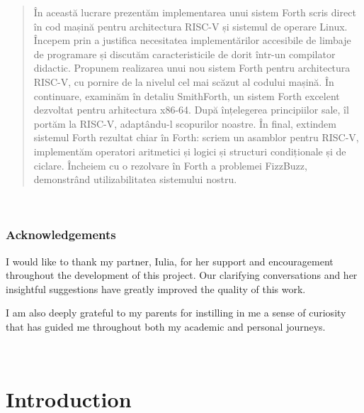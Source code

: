 \documentclass[a4paper,12pt,final]{article}
\begin{document}
\vspace{0.7cm}

\renewcommand{\abstractname}{Rezumat}
\begin{abstract}
În această lucrare prezentăm implementarea unui sistem Forth scris
direct în cod mașină pentru architectura RISC-V și sistemul de operare
Linux.  Începem prin a justifica necesitatea implementărilor
accesibile de limbaje de programare și discutăm caracteristicile de
dorit într-un compilator didactic.  Propunem realizarea unui nou
sistem Forth pentru architectura RISC-V, cu pornire de la nivelul cel
mai scăzut al codului mașină.  În continuare, examinăm în detaliu
SmithForth, un sistem Forth excelent dezvoltat pentru arhitectura
x86-64.  După înțelegerea principiilor sale, îl portăm la RISC-V,
adaptându-l scopurilor noastre.  În final, extindem sistemul Forth
rezultat chiar în Forth: scriem un asamblor pentru RISC-V, implementăm
operatori aritmetici și logici și structuri condiționale și de
ciclare.  Încheiem cu o rezolvare în Forth a problemei FizzBuzz,
demonstrând utilizabilitatea sistemului nostru.
\end{abstract}

\vspace{1cm}
\vspace*{\fill}
\clearpage \ \clearpage


\vspace*{\fill}

\subsubsection*{Acknowledgements}
I would like to thank my partner, Iulia, for her support and
encouragement throughout the development of this project.  Our
clarifying conversations and her insightful suggestions have greatly
improved the quality of this work.

I am also deeply grateful to my parents for instilling in me a sense
of curiosity that has guided me throughout both my academic and
personal journeys.

\vspace{4cm}
\vspace*{\fill}
\clearpage \ \clearpage


\setcounter{tocdepth}{3}
\tableofcontents
\clearpage

\setcounter{page}{11}


\section{Introduction}
\label{sec:org57c56ea}
\end{document}
